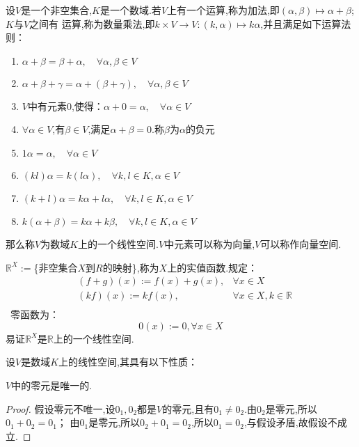 \documentclass[blue,normal,cn]{elegantnote}
\begin{document}
\begin{definition}
设$V$是一个非空集合,$K$是一个数域.若$V$上有一个运算,称为加法,即$(α,β) \mapsto α + β$;$K$与$V$之间有
运算,称为数量乘法,即$k\times V \rightarrow V:(k,α) \mapsto kα$,并且满足如下运算法则：
    \begin{enumerate}[(1)]
        \item $α+β=β+α,\quad \forall α , β ∈ V $
        \item $α+β+γ=α+(β+γ),\quad \forall α,β ∈ V $
        \item $V$中有元素$0$,使得：$α + 0=α,\quad \forall α ∈ V$
        \item $\forall α ∈ V$,有$β ∈ V$,满足$α+β=0$.称$β$为$α$的负元
        \item $1α=α,\quad \forall α ∈ V$
        \item $(kl)α=k(lα),\quad \forall k,l ∈ K,α ∈ V$
        \item $(k+l)α=kα+lα,\quad \forall k,l ∈ K,α ∈ V$
        \item $k(α+β)=kα+kβ,\quad \forall k,l ∈ K,α ∈ V$
    \end{enumerate}
    那么称$V$为数域$K$上的一个线性空间.$V$中元素可以称为向量,$V$可以称作向量空间.
\end{definition}
\begin{example}
    $\mathbb{R}^X:=$\{非空集合$X$到$R$的映射\},称为$X$上的实值函数.规定：
    \begin{equation*}
        \begin{aligned}
        &(f+g)(x):=f(x)+g(x),&\forall x ∈ X\\
        &(kf)(x):=kf(x), &\forall x ∈ X,k∈ \mathbb{R}\\
        \end{aligned}
    \end{equation*}\
    零函数为：
    \begin{equation*}
        0(x):=0,\forall x ∈ X
    \end{equation*}
    易证$\mathbb{R}^X$是$\mathbb{R}$上的一个线性空间.
\end{example}

设$V$是数域$K$上的线性空间,其具有以下性质：

\begin{property}
    $V$中的零元是唯一的.
\end{property}

\begin{proof}
    假设零元不唯一,设$0_1,0_2$都是$V$的零元,且有$0_1 ≠ 0_2 $.由$0_2$是零元,所以$0_1+0_2=0_1$；
    由$0_1$是零元,所以$0_2+0_1=0_2$,所以$0_1=0_2$,与假设矛盾,故假设不成立.
\end{proof}
\end{document}
